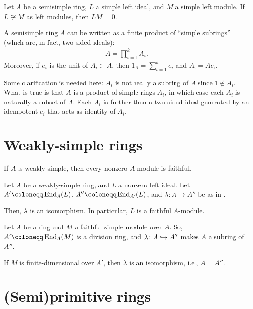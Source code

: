 \documentclass[12pt]{article}
\begin{document}
\begin{thm}
	Let $A$ be a semisimple ring, $L$ a simple left ideal, and $M$ a simple left module. 
	If $L \not\cong M$ as left modules, then $LM = 0$.
\end{thm}

\begin{thm}
	A semisimple ring $A$ can be written as a finite product of ``simple subrings'' (which are, in fact, two-sided ideals):
	\begin{align*} 
		A = \prod_{i = 1}^{k} A_{i}.
	\end{align*}
	Moreover, if $e_{i}$ is the unit of $A_{i} \subset A$, then $1_{A} = \sum_{i = 1}^{k} e_{i}$ and $A_{i} = A e_{i}$.
\end{thm}
Some clarification is needed here: $A_{i}$ is not really a subring of $A$ since $1 \notin A_{i}$. \newline
What is true is that $A$ is a product of simple rings $A_{i}$, in which case each $A_{i}$ is naturally a subset of $A$. 
Each $A_{i}$ is further then a two-sided ideal generated by an idempotent $e_{i}$ that acts as identity of $A_{i}$.

\section{Weakly-simple rings}

\begin{thm}
	If $A$ is weakly-simple, then every nonzero $A$-module is faithful.
\end{thm}

\begin{thm}[Rieffel]
	Let $A$ be a weakly-simple ring, and $L$ a nonzero left ideal. Let $A' \coloneqq \End_{A}(L)$, $A'' \coloneqq \End_{A'}(L)$, and $\lambda \colon A \to A''$ be as in .

	Then, $\lambda$ is an isomorphism. In particular, $L$ is a faithful $A$-module.
\end{thm}

\begin{thm}[Wedderburn]
	Let $A$ be a ring and $M$ a faithful simple module over $A$. So, $A' \coloneqq \End_{A}(M)$ is a division ring, and $\lambda \colon A \hookrightarrow A''$ makes $A$ a subring of $A''$.

	If $M$ is finite-dimensional over $A'$, then $\lambda$ is an isomorphism, i.e., $A = A''$.
\end{thm}

\section{(Semi)primitive rings}
\end{document}
